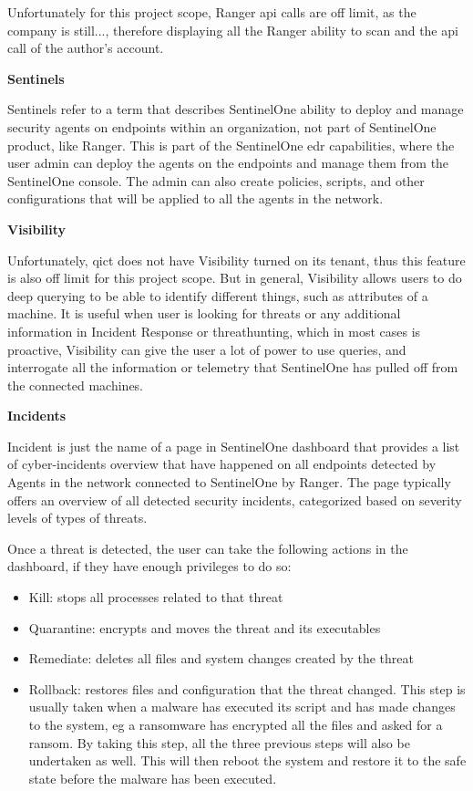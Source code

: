 \begin{multicols}{2}
      Unfortunately for this project scope, Ranger \acrshort{api} calls are off limit, as the company is still..., therefore displaying all
      the Ranger ability to scan and the \acrshort{api} call of the author's account.

      \textbf{Sentinels}

      Sentinels refer to a term that describes SentinelOne ability to deploy and manage security agents on endpoints within an
      organization, not part of SentinelOne product, like Ranger. This is part of the SentinelOne \acrshort{edr} capabilities,
      where the user admin can deploy the agents on the endpoints and manage them from the SentinelOne console. The admin can
      also create policies, scripts, and other configurations that will be applied to all the agents in the network.

      \textbf{Visibility}

      Unfortunately, \acrshort{qict} does not have Visibility turned on its tenant, thus this feature is also off limit for this project
      scope. But in general, Visibility allows users to do deep querying to be able to identify different things, such as attributes of
      a machine. It is useful when user is looking for threats or any additional information in Incident Response or \gls{threathunting},
      which in most cases is proactive, Visibility can give the user a lot of power to use queries, and interrogate all the information
      or telemetry that SentinelOne has pulled off from the connected machines.

      \textbf{Incidents}

      Incident is just the name of a page in SentinelOne dashboard that provides a list of cyber-incidents overview that have happened on all
      endpoints detected by Agents in the network connected to SentinelOne by Ranger. The page typically offers an overview of all detected
      security incidents, categorized based on severity levels of types of threats.

      Once a threat is detected, the user can take the following actions in the dashboard, if they have enough privileges
      to do so:
      \begin{itemize}
            \item Kill: stops all processes related to that threat
            \item Quarantine: encrypts and moves the threat and its executables
            \item Remediate: deletes all files and system changes created by the threat
            \item Rollback: restores files and configuration that the threat changed. This step is usually taken when a malware has
                  executed its script and has made changes to the system, \acrshort{eg} a ransomware has encrypted all the files and
                  asked for a ransom. By taking this step, all the three previous steps will also be undertaken as well. This will
                  then reboot the system and restore it to the safe state before the malware has been executed.
      \end{itemize}


\end{multicols}
